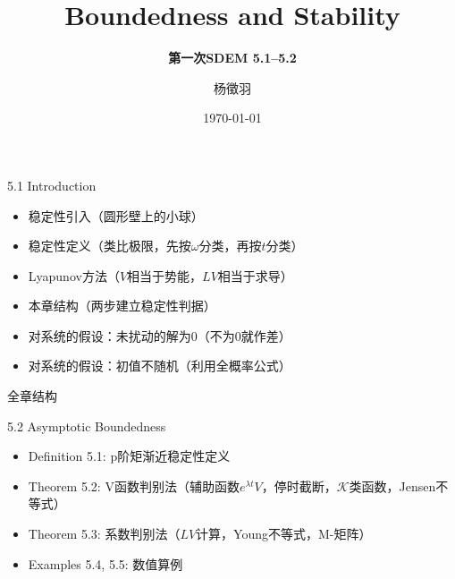 \documentclass[10pt,aspectratio=43]{beamer}
\title{Boundedness and Stability}
\subtitle{\fontsize{9pt}{14pt}\textbf{第一次\quad SDEM 5.1--5.2}}
\author{杨徵羽}
\date{\today}
\begin{document}
\frame{\titlepage}

\begin{frame}{5.1 Introduction}
\begin{itemize}
\item 稳定性引入（圆形壁上的小球）
\item 稳定性定义（类比极限，先按$ \omega $分类，再按$ t $分类）
\item Lyapunov方法（$ V $相当于势能，$ LV $相当于求导）
\item 本章结构（两步建立稳定性判据）
\item 对系统的假设：未扰动的解为0（不为0就作差）
\item 对系统的假设：初值不随机（利用全概率公式）
\end{itemize}
\end{frame}

\begin{frame}{全章结构}
\begin{table}[htbp]%
{}
\end{table}
\end{frame}

\begin{frame}{5.2 Asymptotic Boundedness}
\begin{itemize}
\item Definition 5.1: p阶矩渐近稳定性定义
\item Theorem 5.2: V函数判别法（辅助函数$ e^{\lambda t}V $，停时截断，$ \mathcal{K} $类函数，Jensen不等式）
\item Theorem 5.3: 系数判别法（$ LV $计算，Young不等式，M-矩阵）
\item Examples 5.4, 5.5: 数值算例
\end{itemize}
\end{frame}
\end{document}
